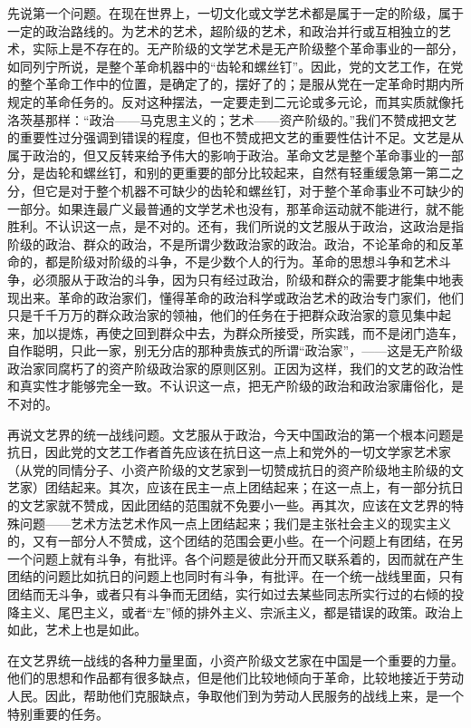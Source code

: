 先说第一个问题。在现在世界上，一切文化或文学艺术都是属于一定的阶级，属于一定的政治路线的。为艺术的艺术，超阶级的艺术，和政治并行或互相独立的艺术，实际上是不存在的。无产阶级的文学艺术是无产阶级整个革命事业的一部分，如同列宁所说，是整个革命机器中的“齿轮和螺丝钉”。因此，党的文艺工作，在党的整个革命工作中的位置，是确定了的，摆好了的；是服从党在一定革命时期内所规定的革命任务的。反对这种摆法，一定要走到二元论或多元论，而其实质就像托洛茨基那样：“政治——马克思主义的；艺术——资产阶级的。”我们不赞成把文艺的重要性过分强调到错误的程度，但也不赞成把文艺的重要性估计不足。文艺是从属于政治的，但又反转来给予伟大的影响于政治。革命文艺是整个革命事业的一部分，是齿轮和螺丝钉，和别的更重要的部分比较起来，自然有轻重缓急第一第二之分，但它是对于整个机器不可缺少的齿轮和螺丝钉，对于整个革命事业不可缺少的一部分。如果连最广义最普通的文学艺术也没有，那革命运动就不能进行，就不能胜利。不认识这一点，是不对的。还有，我们所说的文艺服从于政治，这政治是指阶级的政治、群众的政治，不是所谓少数政治家的政治。政治，不论革命的和反革命的，都是阶级对阶级的斗争，不是少数个人的行为。革命的思想斗争和艺术斗争，必须服从于政治的斗争，因为只有经过政治，阶级和群众的需要才能集中地表现出来。革命的政治家们，懂得革命的政治科学或政治艺术的政治专门家们，他们只是千千万万的群众政治家的领袖，他们的任务在于把群众政治家的意见集中起来，加以提炼，再使之回到群众中去，为群众所接受，所实践，而不是闭门造车，自作聪明，只此一家，别无分店的那种贵族式的所谓“政治家”，——这是无产阶级政治家同腐朽了的资产阶级政治家的原则区别。正因为这样，我们的文艺的政治性和真实性才能够完全一致。不认识这一点，把无产阶级的政治和政治家庸俗化，是不对的。

再说文艺界的统一战线问题。文艺服从于政治，今天中国政治的第一个根本问题是抗日，因此党的文艺工作者首先应该在抗日这一点上和党外的一切文学家艺术家（从党的同情分子、小资产阶级的文艺家到一切赞成抗日的资产阶级地主阶级的文艺家）团结起来。其次，应该在民主一点上团结起来；在这一点上，有一部分抗日的文艺家就不赞成，因此团结的范围就不免要小一些。再其次，应该在文艺界的特殊问题——艺术方法艺术作风一点上团结起来；我们是主张社会主义的现实主义的，又有一部分人不赞成，这个团结的范围会更小些。在一个问题上有团结，在另一个问题上就有斗争，有批评。各个问题是彼此分开而又联系着的，因而就在产生团结的问题比如抗日的问题上也同时有斗争，有批评。在一个统一战线里面，只有团结而无斗争，或者只有斗争而无团结，实行如过去某些同志所实行过的右倾的投降主义、尾巴主义，或者“左”倾的排外主义、宗派主义，都是错误的政策。政治上如此，艺术上也是如此。

在文艺界统一战线的各种力量里面，小资产阶级文艺家在中国是一个重要的力量。他们的思想和作品都有很多缺点，但是他们比较地倾向于革命，比较地接近于劳动人民。因此，帮助他们克服缺点，争取他们到为劳动人民服务的战线上来，是一个特别重要的任务。

